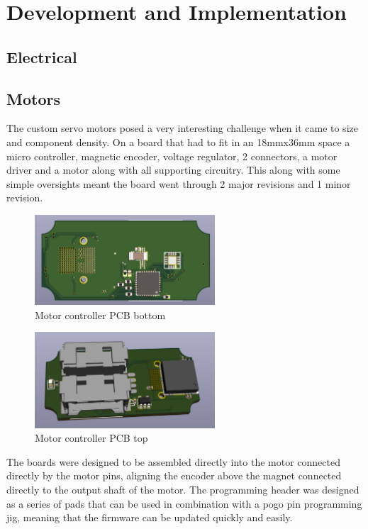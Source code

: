 \section{Development and Implementation}
\subsection{Electrical}
\subsection{Motors}
The custom servo motors posed a very interesting challenge when it came to size and component density. On a board that had to fit in an 18mmx36mm space a micro controller, magnetic encoder, voltage regulator, 2 connectors, a motor driver and a motor along with all supporting circuitry. This along with some simple oversights meant the board went through 2 major revisions and 1 minor revision. 

\begin{figure}[H]
       \centering
       \includegraphics[width=0.6\textwidth]{figures/MotorControllerBottom.png}
       \caption{Motor controller PCB bottom}
       \label{fig:my_label}
   \end{figure}
   \begin{figure}[H]
       \centering
       \includegraphics[width=0.6\textwidth]{figures/MotorControllerTop.png}
       \caption{Motor controller PCB top}
       \label{fig:my_label}
   \end{figure}
The boards were designed to be assembled directly into the motor connected directly by the motor pins, aligning the encoder above the magnet connected directly to the output shaft of the motor. The programming header was designed as a series of pads that can be used in combination with a pogo pin programming jig, meaning that the firmware can be updated quickly and easily. 
